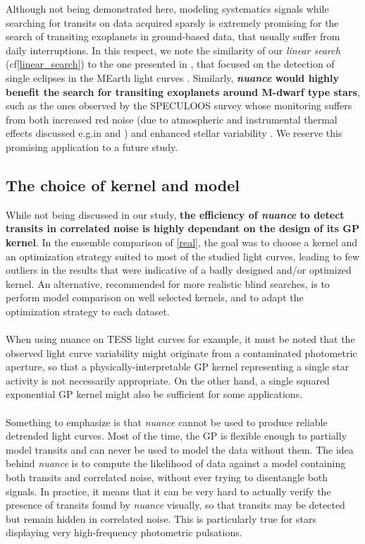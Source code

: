 \documentclass[modern]{aastex631}
\newcommand{\nuancemethod}{\textit{nuance}}
\newcommand{\nuancecode}{\textsf{nuance}}
\begin{document}
Although not being demonstrated here, modeling systematics signals while searching for transits on data acquired sparsly is extremely promising for the search of transiting exoplanets in ground-based data, that usually suffer from daily interruptions. In this respect, we note the similarity of our \textit{linear search} (cf\;\autoref{linear_search}) to the one presented in \citealt{Berta2012}, that focused on the detection of single eclipses in the MEarth light curves \citep{Irwin2009}. Similarly, \textbf{\nuancemethod{} would highly benefit the search for transiting exoplanets around M-dwarf type stars}, such as the ones observed by the SPECULOOS survey \citep{speculoos} whose monitoring suffers from both increased red noise (due to atmospheric and instrumental thermal effects discussed e.g.\;in \citealt{Berta2012} and  \citealt{Pedersen2023}) and enhanced stellar variability \citep{Murray2020}. We reserve this promising application to a future study.

\subsection{The choice of kernel and model}
While not being discussed in our study, \textbf{the efficiency of \nuancemethod{} to detect transits in correlated noise is highly dependant on the design of its GP kernel}. In the ensemble comparison of \autoref{real}, the goal was to choose a kernel and an optimization strategy suited to most of the studied light curves, leading to few outliers in the results that were indicative of a badly designed and/or optimized kernel. An alternative, recommended for more realistic blind searches, is to perform model comparison on well selected kernels, and to adapt the optimization strategy to each dataset.\\\\
When using \nuancecode{} on TESS light curves for example, it must be noted that the observed light curve variability might originate from a contaminated photometric aperture, so that a physically-interpretable GP kernel representing a single star activity is not necessarily appropriate. On the other hand, a single squared exponential GP kernel might also be sufficient for some applications.\\\\
Something to emphasize is that \nuancemethod{} cannot be used to produce reliable detrended light curves. Most of the time, the GP is flexible enough to partially model transits and can never be used to model the data without them. The idea behind \nuancemethod{} is to compute the likelihood of data against a model containing both transits and correlated noise, without ever trying to disentangle both signals. In practice, it means that it can be very hard to actually verify the presence of transits found by \nuancemethod{} visually, so that transits may be detected but remain hidden in correlated noise. This is particularly true for stars displaying very high-frequency photometric pulsations.
\end{document}
